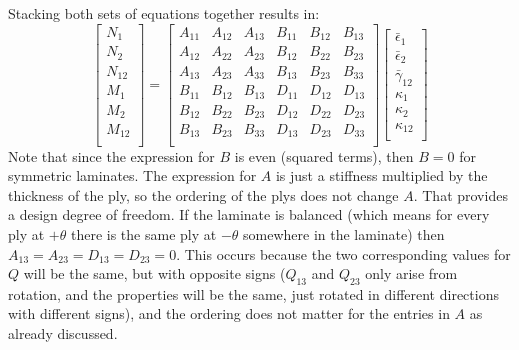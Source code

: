 \documentclass{article}
\begin{document}
Stacking both sets of equations together results in:
\begin{equation}
    \left[
    \begin{matrix}
    N_{1}\\
    N_{2}\\
    N_{12}\\
    M_{1}\\
    M_{2}\\
    M_{12}\\
    \end{matrix}
    \right]
    =
    \left[
    \begin{matrix}
        A_{11} & A_{12} & A_{13} & B_{11} & B_{12} & B_{13} \\
        A_{12} & A_{22} & A_{23} & B_{12} & B_{22} & B_{23} \\
        A_{13} & A_{23} & A_{33} & B_{13} & B_{23} & B_{33} \\
        B_{11} & B_{12} & B_{13} & D_{11} & D_{12} & D_{13} \\
        B_{12} & B_{22} & B_{23}  & D_{12} & D_{22} & D_{23} \\
        B_{13} & B_{23} & B_{33} & D_{13} & D_{23} & D_{33} \\
    \end{matrix}
    \right]
    \left[
    \begin{matrix}
    \bar\epsilon_{1}\\
    \bar\epsilon_{2}\\
    \bar\gamma_{12}\\
    \kappa_1 \\
    \kappa_2 \\
    \kappa_{12} \\
    \end{matrix}
    \right]
    \label{eq:ABD}
    \end{equation}
    Note that since the expression for $B$ is even (squared terms), then $B = 0$ for symmetric laminates.  The expression for $A$ is just a stiffness multiplied by the thickness of the ply, so the ordering of the plys does not change $A$. That provides a design degree of freedom.  If the laminate is balanced (which means for every ply at $+\theta$ there is the same ply at $-\theta$ somewhere in the laminate) then $A_{13} = A_{23} = D_{13} = D_{23} = 0$.  This occurs because the two corresponding values for $Q$ will be the same, but with opposite signs ($Q_{13}$ and $Q_{23}$ only arise from rotation, and the properties will be the same, just rotated in different directions with different signs), and the ordering does not matter for the entries in $A$ as already discussed.
\end{document}
